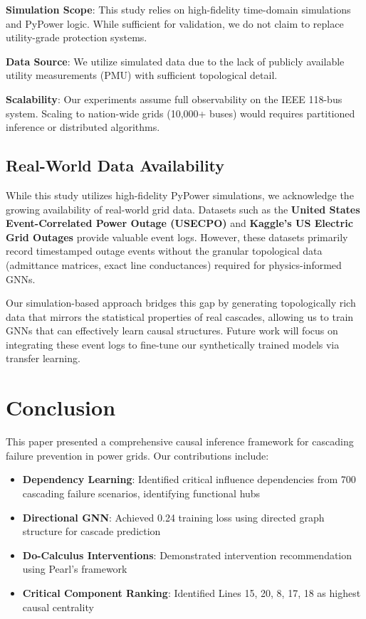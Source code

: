 \documentclass[journal,12pt,onecolumn]{IEEEtran}
\begin{document}
\textbf{Simulation Scope}: This study relies on high-fidelity time-domain simulations and PyPower logic. While sufficient for validation, we do not claim to replace utility-grade protection systems.

\textbf{Data Source}: We utilize simulated data due to the lack of publicly available utility measurements (PMU) with sufficient topological detail.

\textbf{Scalability}: Our experiments assume full observability on the IEEE 118-bus system. Scaling to nation-wide grids (10,000+ buses) would requires partitioned inference or distributed algorithms.

\subsection{Real-World Data Availability}

While this study utilizes high-fidelity PyPower simulations, we acknowledge the growing availability of real-world grid data. Datasets such as the \textbf{United States Event-Correlated Power Outage (USECPO)} and \textbf{Kaggle's US Electric Grid Outages} provide valuable event logs. However, these datasets primarily record timestamped outage events without the granular topological data (admittance matrices, exact line conductances) required for physics-informed GNNs.

Our simulation-based approach bridges this gap by generating topologically rich data that mirrors the statistical properties of real cascades, allowing us to train GNNs that can effectively learn causal structures. Future work will focus on integrating these event logs to fine-tune our synthetically trained models via transfer learning.

\section{Conclusion}
\label{sec:conclusion}

This paper presented a comprehensive causal inference framework for cascading failure prevention in power grids. Our contributions include:

\begin{itemize}
    \item \textbf{Dependency Learning}: Identified critical influence dependencies from 700 cascading failure scenarios, identifying functional hubs
    
    \item \textbf{Directional GNN}: Achieved 0.24 training loss using directed graph structure for cascade prediction
    
    \item \textbf{Do-Calculus Interventions}: Demonstrated intervention recommendation using Pearl's framework
    
    \item \textbf{Critical Component Ranking}: Identified Lines 15, 20, 8, 17, 18 as highest causal centrality
\end{itemize}
\end{document}
